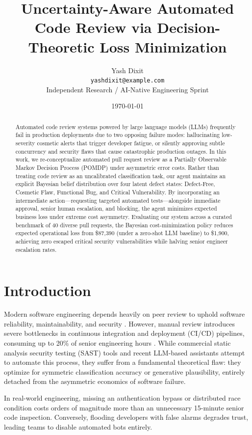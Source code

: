 \documentclass[10pt,twocolumn,letterpaper]{article}
\title{Uncertainty-Aware Automated Code Review via Decision-Theoretic Loss Minimization}
\author{
  Yash Dixit\\
  \texttt{yashdixit@example.com}\\
  Independent Research / AI-Native Engineering Sprint
}
\date{\today}
\begin{document}
\maketitle

\begin{abstract}
Automated code review systems powered by large language models (LLMs) frequently fail in production deployments due to two opposing failure modes: hallucinating low-severity cosmetic alerts that trigger developer fatigue, or silently approving subtle concurrency and security flaws that cause catastrophic production outages. In this work, we re-conceptualize automated pull request review as a Partially Observable Markov Decision Process (POMDP) under asymmetric error costs. Rather than treating code review as an uncalibrated classification task, our agent maintains an explicit Bayesian belief distribution over four latent defect states: Defect-Free, Cosmetic Flaw, Functional Bug, and Critical Vulnerability. By incorporating an intermediate action—requesting targeted automated tests—alongside immediate approval, senior human escalation, and blocking, the agent minimizes expected business loss under extreme cost asymmetry. Evaluating our system across a curated benchmark of 40 diverse pull requests, the Bayesian cost-minimization policy reduces expected operational loss from \$87,390 (under a zero-shot LLM baseline) to \$1,900, achieving zero escaped critical security vulnerabilities while halving senior engineer escalation rates.
\end{abstract}

\section{Introduction}
Modern software engineering depends heavily on peer review to uphold software reliability, maintainability, and security \cite{gousios2014large}. However, manual review introduces severe bottlenecks in continuous integration and deployment (CI/CD) pipelines, consuming up to 20\% of senior engineering hours \cite{tsay2014influence}. While commercial static analysis security testing (SAST) tools and recent LLM-based assistants attempt to automate this process, they suffer from a fundamental theoretical flaw: they optimize for symmetric classification accuracy or generative plausibility, entirely detached from the asymmetric economics of software failure.

In real-world engineering, missing an authentication bypass or distributed race condition costs orders of magnitude more than an unnecessary 15-minute senior code inspection. Conversely, flooding developers with false alarms degrades trust, leading teams to disable automated bots entirely. 
\end{document}
